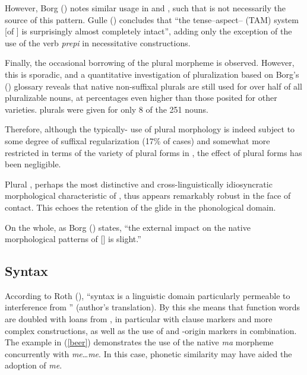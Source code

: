 \documentclass[output=paper]{langsci/langscibook}
\begin{document}
However, Borg (\citeyear[3]{Borg2004}) notes similar usage in   and , such that  is not necessarily the source of this pattern. Gulle (\citeyear[47]{Gulle2016}) concludes that “the tense--aspect-- (TAM) system [of ] is surprisingly almost completely intact”, adding only the exception of the use of the   verb \textit{prepi} in necessitative constructions.

Finally, the occasional borrowing of the  plural morpheme is observed. However, this is sporadic, and a quantitative investigation of pluralization based on Borg's (\citeyear{Borg2004}) glossary \citep{Walter2017} reveals that native non-suffixal plurals are still used for over half of all pluralizable nouns, at percentages even higher than those posited for other  varieties.  plurals were given for only 8 of the 251 nouns.

Therefore, although the typically- use of  plural morphology is indeed subject to some degree of suffixal regularization (17\% of cases) and somewhat more restricted in terms of the variety of plural forms in , the effect of  plural forms has been negligible.

Plural , perhaps the most distinctive and cross-linguistically idiosyncratic morphological characteristic of , thus appears remarkably robust in the face of contact. This echoes the retention of the  glide in the phonological domain.

On the whole, as Borg (\citeyear[57]{Borg1994}) states, “the external impact on the native morphological patterns of [] is slight.”

\subsection{Syntax}

According to Roth (\citeyear[70]{Roth2004}), “syntax is a linguistic domain particularly permeable to interference from ” (author’s translation). By this she means that function words are doubled with loans from , in particular with  clause markers and more complex constructions, as well as the use of  and -origin  markers in combination. The example in (\ref{beer}) demonstrates the  use of the native \textit{ma}  morpheme concurrently with  \textit{me}…\textit{me}. In this case, phonetic similarity may have aided the adoption of \textit{me}.
\end{document}
